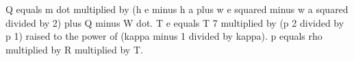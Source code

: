 Q equals m dot multiplied by (h e minus h a plus w e squared minus w a squared divided by 2) plus Q minus W dot.  
T e equals T 7 multiplied by (p 2 divided by p 1) raised to the power of (kappa minus 1 divided by kappa).  
p equals rho multiplied by R multiplied by T.